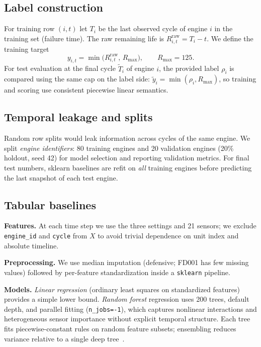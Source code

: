 \documentclass[11pt]{article}
\begin{document}
\subsection{Label construction}
For training row $(i,t)$ let $T_i$ be the last observed cycle of engine $i$ in the training set (failure time). The raw remaining life is $R^{\mathrm{raw}}_{i,t} = T_i - t$. We define the training target
\begin{equation}
  y_{i,t} = \min\bigl(R^{\mathrm{raw}}_{i,t},\, R_{\max}\bigr), \qquad R_{\max}=125 .
\end{equation}
For test evaluation at the final cycle $\tilde{T}_i$ of engine $i$, the provided label $\rho_i$ is compared using the same cap on the label side: $\tilde{y}_i = \min(\rho_i, R_{\max})$, so training and scoring use consistent piecewise linear semantics.

\subsection{Temporal leakage and splits}
Random row splits would leak information across cycles of the same engine. We split \emph{engine identifiers}: 80 training engines and 20 validation engines (20\% holdout, seed 42) for model selection and reporting validation metrics. For final test numbers, sklearn baselines are refit on \emph{all} training engines before predicting the last snapshot of each test engine.

\subsection{Tabular baselines}
\textbf{Features.} At each time step we use the three settings and 21 sensors; we exclude \texttt{engine\_id} and \texttt{cycle} from $X$ to avoid trivial dependence on unit index and absolute timeline.

\textbf{Preprocessing.} We use median imputation (defensive; FD001 has few missing values) followed by per-feature standardization inside a \texttt{sklearn} pipeline.

\textbf{Models.} \emph{Linear regression} (ordinary least squares on standardized features) provides a simple lower bound. \emph{Random forest} regression uses 200 trees, default depth, and parallel fitting (\texttt{n\_jobs=-1}), which captures nonlinear interactions and heterogeneous sensor importance without explicit temporal structure. Each tree fits piecewise-constant rules on random feature subsets; ensembling reduces variance relative to a single deep tree~\cite{breiman2001random}.
\end{document}
